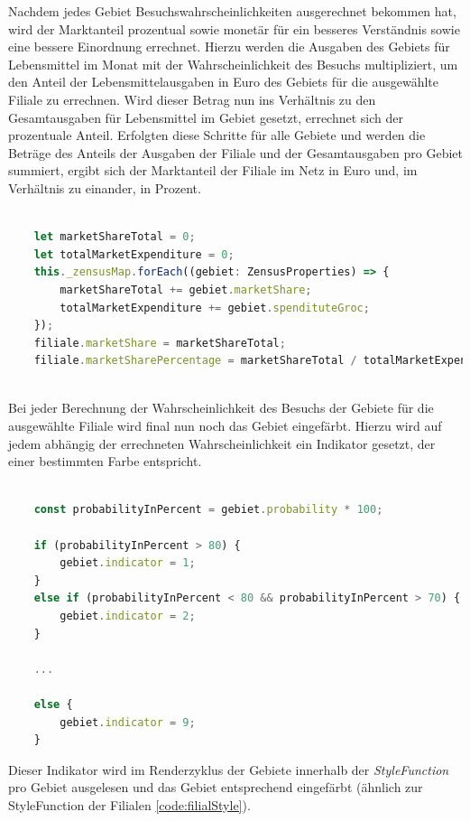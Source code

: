Nachdem jedes Gebiet Besuchswahrscheinlichkeiten ausgerechnet bekommen hat, wird der Marktanteil prozentual sowie monetär für ein besseres Verständnis sowie eine bessere Einordnung errechnet.
Hierzu werden die Ausgaben des Gebiets für Lebensmittel im Monat mit der Wahrscheinlichkeit des Besuchs multipliziert, um den Anteil der Lebensmittelausgaben in Euro des Gebiets für die ausgewählte Filiale zu errechnen.
Wird dieser Betrag nun ins Verhältnis zu den Gesamtausgaben für Lebensmittel im Gebiet gesetzt, errechnet sich der prozentuale Anteil.
Erfolgten diese Schritte für alle Gebiete und werden die Beträge des Anteils der Ausgaben der Filiale und der Gesamtausgaben pro Gebiet summiert, ergibt sich der Marktanteil der Filiale im Netz in Euro und, im Verhältnis zu einander, in Prozent.

\begin{lstlisting}[language=JavaScript]
	
	let marketShareTotal = 0;
	let totalMarketExpenditure = 0;
	this._zensusMap.forEach((gebiet: ZensusProperties) => {
		marketShareTotal += gebiet.marketShare;
		totalMarketExpenditure += gebiet.spendituteGroc;
	});
	filiale.marketShare = marketShareTotal;
	filiale.marketSharePercentage = marketShareTotal / totalMarketExpenditure;
	
\end{lstlisting}

Bei jeder Berechnung der Wahrscheinlichkeit des Besuchs der Gebiete für die ausgewählte Filiale wird final nun noch das Gebiet eingefärbt.
Hierzu wird auf jedem abhängig der errechneten Wahrscheinlichkeit ein Indikator gesetzt, der einer bestimmten Farbe entspricht.

\begin{lstlisting}[language=JavaScript]
	
	const probabilityInPercent = gebiet.probability * 100;
	
	if (probabilityInPercent > 80) {
		gebiet.indicator = 1;
	}
	else if (probabilityInPercent < 80 && probabilityInPercent > 70) {
		gebiet.indicator = 2;
	}

	...
	
	else {
		gebiet.indicator = 9;
	}
\end{lstlisting}


Dieser Indikator wird im Renderzyklus der Gebiete innerhalb der \emph{StyleFunction} pro Gebiet ausgelesen und das Gebiet entsprechend eingefärbt (ähnlich zur StyleFunction der Filialen \ref{code:filialStyle}).

